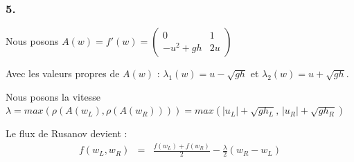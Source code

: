 \documentclass{article}
\begin{document}
\subsubsection*{5.}

Nous posons $A(w) = f'(w) = \begin{pmatrix} 0 & 1 \\ -u^2+gh & 2u \end{pmatrix}$

Avec les valeurs propres de $A(w)$ : $\lambda_1(w) = u - \sqrt{gh}$ et $\lambda_2(w) = u + \sqrt{gh}$.

Nous posons la vitesse $\lambda = max(\rho(A(w_L), \rho(A(w_R)))) = max(|u_L|+\sqrt{gh_L}, \, |u_R|+\sqrt{gh_R})$

Le flux de Rusanov devient :
\begin{eqnarray*}
    f(w_L, w_R) &=& \frac{f(w_L) + f(w_R)}{2} - \frac{\lambda}{2} (w_R - w_L) \\
\end{eqnarray*}
\end{document}
